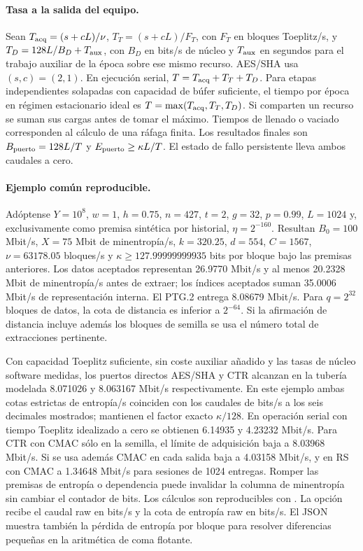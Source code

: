 \paragraph{Tasa a la salida del equipo.}
Sean \(T_{\rm acq}=(s+cL)/\nu\), \(T_T=(s+cL)/F_T\), con \(F_T\)
en bloques Toeplitz/s, y \(T_D=128L/B_D+T_{\rm aux}\), con \(B_D\)
en bits/s de núcleo y \(T_{\rm aux}\) en segundos para el trabajo auxiliar
de la época sobre ese mismo recurso. AES/SHA usa \((s,c)=(2,1)\).
En ejecución serial, \(T=T_{\rm acq}+T_T+T_D\). Para etapas independientes
solapadas con capacidad de búfer suficiente, el tiempo por época en régimen
estacionario ideal es \(T=\max(T_{\rm acq},T_T,T_D)\). Si comparten un
recurso se suman sus cargas antes de tomar el máximo. Tiempos de llenado o
vaciado corresponden al cálculo de una ráfaga finita. Los resultados finales
son \(B_{\rm puerto}=128L/T\) y \(E_{\rm puerto}\ge\kappa L/T\).
El estado de fallo persistente lleva ambos caudales a cero.

\paragraph{Ejemplo común reproducible.}
Adóptense \(Y=10^8\), \(w=1\), \(h=0.75\), \(n=427\), \(t=2\),
\(g=32\), \(p=0.99\), \(L=1024\) y, exclusivamente como premisa sintética por
historial, \(\eta=2^{-160}\). Resultan \(B_0=100\) Mbit/s,
\(X=75\) Mbit de minentropía/s, \(k=320.25\), \(d=554\),
\(C=1567\), \(\nu=63178.05\) bloques/s y
\(\kappa\ge127.99999999935\) bits por bloque bajo las premisas anteriores.
Los datos aceptados representan 26.9770 Mbit/s y al menos 20.2328 Mbit
de minentropía/s antes de extraer; los índices aceptados suman 35.0006
Mbit/s de representación interna. El PTG.2 entrega 8.08679 Mbit/s.
Para \(q=2^{32}\) bloques de datos, la cota de distancia es inferior a
\(2^{-64}\). Si la afirmación de distancia incluye además los bloques
de semilla se usa el número total de extracciones pertinente.

Con capacidad Toeplitz suficiente, sin coste auxiliar añadido y las tasas
de núcleo software medidas, los puertos directos AES/SHA y CTR alcanzan en
la tubería modelada 8.071026 y 8.063167 Mbit/s respectivamente. En este
ejemplo ambas cotas estrictas de entropía/s coinciden con los caudales de
bits/s a los seis decimales mostrados; mantienen el factor exacto
\(\kappa/128\). En operación serial con tiempo Toeplitz idealizado a cero
se obtienen 6.14935 y 4.23232 Mbit/s. Para CTR con CMAC sólo en la
semilla, el límite de adquisición baja a 8.03968 Mbit/s. Si se usa además
CMAC en cada salida baja a 4.03158 Mbit/s, y en RS con CMAC a 1.34648
Mbit/s para sesiones de 1024 entregas. Romper las premisas de entropía o
dependencia puede invalidar la columna de minentropía sin cambiar el
contador de bits. Los cálculos son reproducibles con
. La opción  recibe
el caudal raw en bits/s y  la cota de entropía
raw en bits/s. El JSON muestra también la pérdida de entropía por bloque
para resolver diferencias pequeñas en la aritmética de coma flotante.
